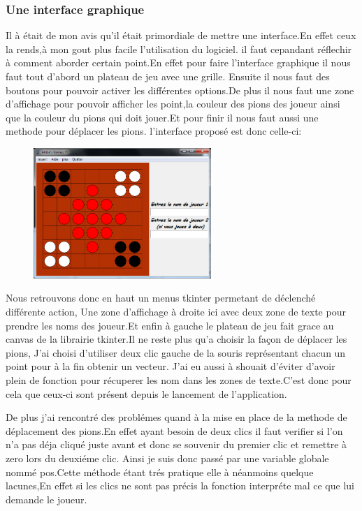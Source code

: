 \documentclass{article}
\begin{document}
\subsubsection{Une interface graphique}
Il à était de mon avis qu'il était primordiale de mettre une interface.En effet ceux la rends,à mon gout plus facile l'utilisation du logiciel.
il faut cepandant réflechir à comment aborder certain point.En effet pour faire l'interface graphique il nous faut tout d'abord un plateau de jeu avec une grille. Ensuite il nous faut des boutons pour pouvoir activer les différentes options.De plus il nous faut une zone d'affichage pour pouvoir afficher les point,la couleur des pions des joueur ainsi que la couleur du pions qui doit jouer.Et pour finir il nous faut aussi une methode pour déplacer les pions.
l'interface proposé est donc celle-ci:

\begin{figure}[!h]
\centerline{\includegraphics[width=0.6\textwidth]{images/Akiba.png}}
\vspace{1cm}
\caption{}
\end{figure}

Nous retrouvons donc en haut un menus tkinter permetant de déclenché différente action, Une zone d'affichage à droite ici avec deux zone de texte pour prendre les noms des joueur.Et enfin à gauche le plateau de jeu fait grace au canvas de la librairie tkinter.Il ne reste plus qu'a choisir la façon de déplacer les pions, J'ai choisi d'utiliser deux clic gauche de la souris représentant chacun un point pour à la fin obtenir un vecteur.
J'ai eu aussi à shouait d'éviter d'avoir plein de fonction pour récuperer les nom dans les zones de texte.C'est donc pour cela que ceux-ci sont présent depuis le lancement de l'application.

De plus j'ai rencontré des problémes quand à la mise en place de la methode de déplacement des pions.En effet ayant besoin de deux clics il faut verifier si l'on n'a pas déja cliqué juste avant et donc se souvenir du premier clic et remettre à zero lors du deuxiéme clic. Ainsi je suis donc passé par une variable globale nommé pos.Cette méthode étant trés pratique elle à néanmoins quelque lacunes,En effet si les clics ne sont pas précis la fonction interpréte mal ce que lui demande le joueur.
\end{document}
